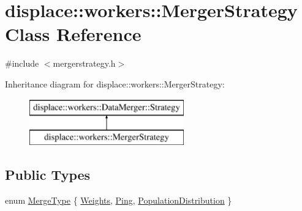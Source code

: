\hypertarget{classdisplace_1_1workers_1_1_merger_strategy}{}\section{displace\+::workers\+::Merger\+Strategy Class Reference}
\label{classdisplace_1_1workers_1_1_merger_strategy}


{\ttfamily \#include $<$mergerstrategy.\+h$>$}

Inheritance diagram for displace\+::workers\+::Merger\+Strategy\+:\begin{figure}[H]
\begin{center}
\leavevmode
\includegraphics[height=2.000000cm]{dc/d4b/classdisplace_1_1workers_1_1_merger_strategy}
\end{center}
\end{figure}
\subsection*{Public Types}
\begin{DoxyCompactItemize}
\item 
enum \mbox{\hyperlink{classdisplace_1_1workers_1_1_merger_strategy_a2836a7e3ec6a70b4a868057840d52915}{Merge\+Type}} \{ \mbox{\hyperlink{classdisplace_1_1workers_1_1_merger_strategy_a2836a7e3ec6a70b4a868057840d52915a2814254e1683ca068337821e547de07a}{Weights}}, 
\mbox{\hyperlink{classdisplace_1_1workers_1_1_merger_strategy_a2836a7e3ec6a70b4a868057840d52915a43014285e8e1570d1a597a2d64e86a99}{Ping}}, 
\mbox{\hyperlink{classdisplace_1_1workers_1_1_merger_strategy_a2836a7e3ec6a70b4a868057840d52915abfaeb82f9881abca3682717328aca1ee}{Population\+Distribution}}
 \}
\end{DoxyCompactItemize}
